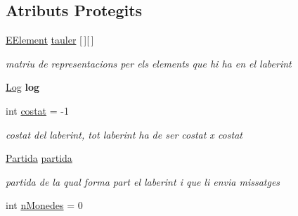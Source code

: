 \subsection*{Atributs Protegits}
\begin{DoxyCompactItemize}
\item 
\hypertarget{classlogica_1_1laberints_1_1_laberint_adf27aa8fa875b4a3f996756bc5cf9e69}{\hyperlink{enumlogica_1_1enumeracions_1_1_e_element}{E\+Element} \hyperlink{classlogica_1_1laberints_1_1_laberint_adf27aa8fa875b4a3f996756bc5cf9e69}{tauler} \mbox{[}$\,$\mbox{]}\mbox{[}$\,$\mbox{]}}\label{classlogica_1_1laberints_1_1_laberint_adf27aa8fa875b4a3f996756bc5cf9e69}

\begin{DoxyCompactList}\small\item\em matriu de representacions per els elements que hi ha en el laberint \end{DoxyCompactList}\item 
\hypertarget{classlogica_1_1laberints_1_1_laberint_af79e8923817b5a8eece7bf85aba9290c}{\hyperlink{classlogica_1_1log_1_1_log}{Log} {\bfseries log}}\label{classlogica_1_1laberints_1_1_laberint_af79e8923817b5a8eece7bf85aba9290c}

\item 
\hypertarget{classlogica_1_1laberints_1_1_laberint_ae874ac4889592b811709f5b967d85286}{int \hyperlink{classlogica_1_1laberints_1_1_laberint_ae874ac4889592b811709f5b967d85286}{costat} = -\/1}\label{classlogica_1_1laberints_1_1_laberint_ae874ac4889592b811709f5b967d85286}

\begin{DoxyCompactList}\small\item\em costat del laberint, tot laberint ha de ser costat x costat \end{DoxyCompactList}\item 
\hypertarget{classlogica_1_1laberints_1_1_laberint_a7183ce070714f73e078bb36e8c21b575}{\hyperlink{classlogica_1_1_partida}{Partida} \hyperlink{classlogica_1_1laberints_1_1_laberint_a7183ce070714f73e078bb36e8c21b575}{partida}}\label{classlogica_1_1laberints_1_1_laberint_a7183ce070714f73e078bb36e8c21b575}

\begin{DoxyCompactList}\small\item\em partida de la qual forma part el laberint i que li envia missatges \end{DoxyCompactList}\item 
\hypertarget{classlogica_1_1laberints_1_1_laberint_af1c4b00f98c8109c6bb2c7aadedd024d}{int \hyperlink{classlogica_1_1laberints_1_1_laberint_af1c4b00f98c8109c6bb2c7aadedd024d}{n\+Monedes} = 0}\label{classlogica_1_1laberints_1_1_laberint_af1c4b00f98c8109c6bb2c7aadedd024d}


\end{DoxyCompactItemize}
